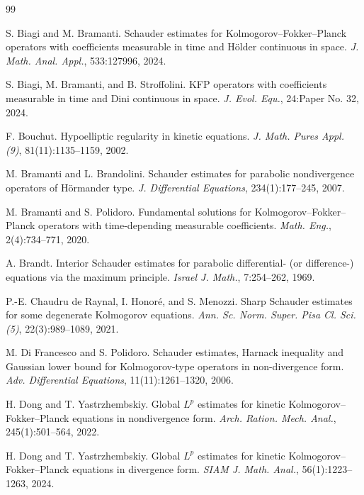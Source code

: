 \documentclass[11pt,reqno]{amsart}
\numberwithin{equation}{section}
\theoremstyle{remark}
\begin{document}
\begin{thebibliography}{99}

S. Biagi and M. Bramanti.
\newblock Schauder estimates for Kolmogorov--Fokker--Planck operators with coefficients measurable in time and H\"older continuous in space.
\newblock \emph{J. Math. Anal. Appl.}, 533:127996, 2024.

S. Biagi, M. Bramanti, and B. Stroffolini.
\newblock KFP operators with coefficients measurable in time and Dini continuous in space.
\newblock \emph{J. Evol. Equ.}, 24:Paper No. 32, 2024.

F. Bouchut.
\newblock Hypoelliptic regularity in kinetic equations.
\newblock \emph{J. Math. Pures Appl. (9)}, 81(11):1135--1159, 2002.

M. Bramanti and L. Brandolini.
\newblock Schauder estimates for parabolic nondivergence operators of H\"ormander type.
\newblock \emph{J. Differential Equations}, 234(1):177--245, 2007.

M. Bramanti and S. Polidoro.
\newblock Fundamental solutions for Kolmogorov--Fokker--Planck operators with time-depending measurable coefficients.
\newblock \emph{Math. Eng.}, 2(4):734--771, 2020.

A. Brandt.
\newblock Interior Schauder estimates for parabolic differential- (or difference-) equations via the maximum principle.
\newblock \emph{Israel J. Math.}, 7:254--262, 1969.

P.-E. Chaudru de Raynal, I. Honor\'e, and S. Menozzi.
\newblock Sharp Schauder estimates for some degenerate Kolmogorov equations.
\newblock \emph{Ann. Sc. Norm. Super. Pisa Cl. Sci. (5)}, 22(3):989--1089, 2021.

M. Di Francesco and S. Polidoro.
\newblock Schauder estimates, Harnack inequality and Gaussian lower bound for Kolmogorov-type operators in non-divergence form.
\newblock \emph{Adv. Differential Equations}, 11(11):1261--1320, 2006.

H. Dong and T. Yastrzhembskiy.
\newblock Global \(L^p\) estimates for kinetic Kolmogorov--Fokker--Planck equations in nondivergence form.
\newblock \emph{Arch. Ration. Mech. Anal.}, 245(1):501--564, 2022.

H. Dong and T. Yastrzhembskiy.
\newblock Global \(L^p\) estimates for kinetic Kolmogorov--Fokker--Planck equations in divergence form.
\newblock \emph{SIAM J. Math. Anal.}, 56(1):1223--1263, 2024.


\end{thebibliography}
\end{document}
